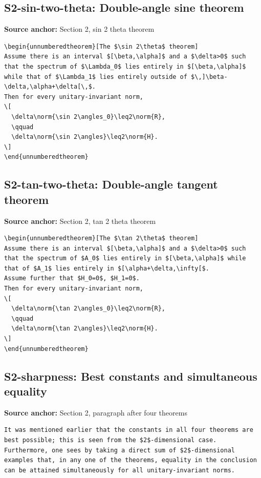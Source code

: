\subsection*{S2-sin-two-theta: Double-angle sine theorem}
\noindent\textbf{Source anchor:} Section 2, sin 2 theta theorem\\
\begin{verbatim}
\begin{unnumberedtheorem}[The $\sin 2\theta$ theorem]
Assume there is an interval $[\beta,\alpha]$ and a $\delta>0$ such that the spectrum of $\Lambda_0$ lies entirely in $[\beta,\alpha]$ while that of $\Lambda_1$ lies entirely outside of $\,]\beta-\delta,\alpha+\delta[\,$.
Then for every unitary-invariant norm,
\[
  \delta\norm{\sin 2\angles_0}\leq2\norm{R},
  \qquad
  \delta\norm{\sin 2\angles}\leq2\norm{H}.
\]
\end{unnumberedtheorem}
\end{verbatim}

\subsection*{S2-tan-two-theta: Double-angle tangent theorem}
\noindent\textbf{Source anchor:} Section 2, tan 2 theta theorem\\
\begin{verbatim}
\begin{unnumberedtheorem}[The $\tan 2\theta$ theorem]
Assume there is an interval $[\beta,\alpha]$ and a $\delta>0$ such that the spectrum of $A_0$ lies entirely in $[\beta,\alpha]$ while that of $A_1$ lies entirely in $[\alpha+\delta,\infty[$.
Assume further that $H_0=0$, $H_1=0$.
Then for every unitary-invariant norm,
\[
  \delta\norm{\tan 2\angles_0}\leq2\norm{R},
  \qquad
  \delta\norm{\tan 2\angles}\leq2\norm{H}.
\]
\end{unnumberedtheorem}
\end{verbatim}

\subsection*{S2-sharpness: Best constants and simultaneous equality}
\noindent\textbf{Source anchor:} Section 2, paragraph after four theorems\\
\begin{verbatim}
It was mentioned earlier that the constants in all four theorems are best possible; this is seen from the $2$-dimensional case.
Furthermore, one sees by taking a direct sum of $2$-dimensional examples that, in any one of the theorems, equality in the conclusion can be attained simultaneously for all unitary-invariant norms.
\end{verbatim}

